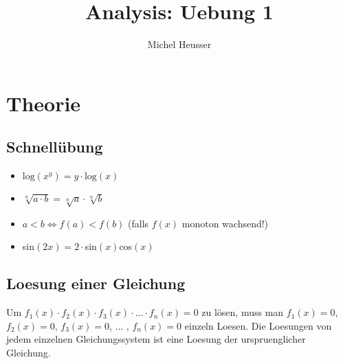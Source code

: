 \documentclass[11pt]{article} %
\title{Analysis: Uebung 1}
\author{Michel Heusser}
\begin{document}
\maketitle

\section{Theorie}


\subsection{Schnellübung}

\begin{itemize}

\item $\textrm{log}(x^y) = y \cdot \textrm{log}(x)$

\item $\sqrt[n]{a\cdot b} = \sqrt[n]{a} \cdot \sqrt[n]{b}$

\item $ a  <  b \Leftrightarrow f(a) < f(b) $ (falls $f(x)$ monoton wachsend!)

\item sin$(2x) =  2\cdot$sin$(x)$cos$(x)$ 

\end{itemize}
\subsection{Loesung einer Gleichung}
Um $f_1(x)\cdot f_2(x) \cdot f_3(x)\cdot ... \cdot f_n(x) = 0$ zu lösen, muss man $f_1(x) = 0$, $f_2(x) = 0$, $f_3(x) = 0$, ... , $f_n(x) = 0$ einzeln Loesen. Die Loesungen von jedem einzelnen Gleichungssystem ist eine Loesung der urspruenglicher Gleichung.
\end{document}
